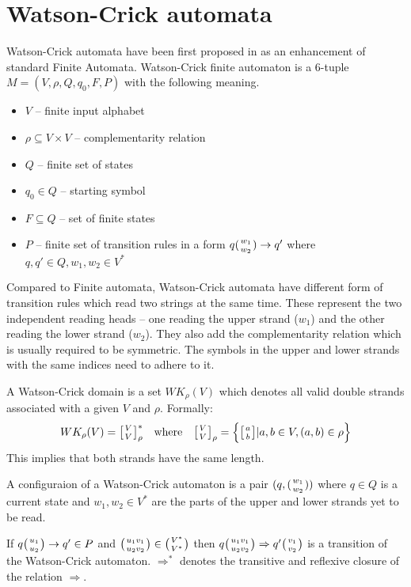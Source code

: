 \section{Watson-Crick automata}
Watson-Crick automata have been first proposed in \cite{WK_FIN_AUT} as an enhancement of standard Finite Automata. Watson-Crick finite automaton is a 6-tuple $M = (V, \rho, Q, q_0, F, P)$ with the following meaning.
\begin{itemize}
  \item{$V$ -- finite input alphabet}
  \item{$\rho \subseteq V \times V$ -- complementarity relation}
  \item{$Q$ -- finite set of states}
  \item{$q_0 \in Q$ -- starting symbol}
  \item{$F \subseteq Q$ -- set of finite states}
  \item{$P$ -- finite set of transition rules in a form $q({w_1 \atop w_2}) \rightarrow q'$ where $q, q' \in Q, w_1, w_2 \in V^*$}
\end{itemize}

Compared to Finite automata, Watson-Crick automata have different form of transition rules which read two strings at the same time. These represent the two independent reading heads -- one reading the upper strand ($w_1$) and the other reading the lower strand ($w_2$). They also add the complementarity relation which is usually required to be symmetric. The symbols in the upper and lower strands with the same indices need to adhere to it.

A Watson-Crick domain is a set $WK_{\rho}(V)$ which denotes all valid double strands associated with a given $V$ and $\rho$. Formally:
\begin{align}
	WK_{\rho}(V) = \wkdomain{V}{V}_{\rho}^{*} && \textnormal{where} && \wkdomain{V}{V}_{\rho} = \Big\{\wkdomain{a}{b} | a, b \in V, (a, b) \in \rho \Big\}
\end{align}
This implies that both strands have the same length.

A configuraion of a Watson-Crick automaton is a pair $(q, ({w_1 \atop w_2}))$ where $q \in Q$ is a current state and $w_1, w_2 \in V^*$ are the parts of the upper and lower strands yet to be read.

If $q\big({u_1 \atop u_2}\big) \rightarrow q' \in P$ and $\big({u_1 v_1 \atop u_2 v_2}\big) \in \big({V^* \atop V^*}\big)$ then $q\big({u_1 v_1 \atop u_2 v_2}\big) \Rightarrow q'\big({v_1 \atop v_2}\big)$ is a transition of the Watson-Crick automaton. $\Rightarrow^*$ denotes the transitive and reflexive closure of the relation $\Rightarrow$.

